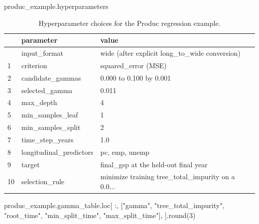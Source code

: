 \documentclass[
  letterpaper,
  DIV=11,
  numbers=noendperiod]{scrartcl}
\newenvironment{Shaded}{\begin{snugshade}}{\end{snugshade}}
\newcommand{\BuiltInTok}[1]{\textcolor[rgb]{0.00,0.23,0.31}{#1}}
\newcommand{\DecValTok}[1]{\textcolor[rgb]{0.68,0.00,0.00}{#1}}
\newcommand{\NormalTok}[1]{\textcolor[rgb]{0.00,0.23,0.31}{#1}}
\newcommand{\StringTok}[1]{\textcolor[rgb]{0.13,0.47,0.30}{#1}}
\begin{document}
\begin{Shaded}
\begin{Highlighting}[]
\NormalTok{produc\_example.hyperparameters}
\end{Highlighting}
\end{Shaded}

\begin{longtable}[]{@{}lll@{}}

\caption{\label{tbl-produc-hyperparameters}Hyperparameter choices for
the Produc regression example.}

\tabularnewline

\toprule\noalign{}
& parameter & value \\
\midrule\noalign{}
\endhead
\bottomrule\noalign{}
\endlastfoot
0 & input\_format & wide (after explicit long\_to\_wide conversion) \\
1 & criterion & squared\_error (MSE) \\
2 & candidate\_gammas & 0.000 to 0.100 by 0.001 \\
3 & selected\_gamma & 0.011 \\
4 & max\_depth & 4 \\
5 & min\_samples\_leaf & 1 \\
6 & min\_samples\_split & 2 \\
7 & time\_step\_years & 1.0 \\
8 & longitudinal\_predictors & pc, emp, unemp \\
9 & target & final\_gsp at the held-out final year \\
10 & selection\_rule & minimize training tree\_total\_impurity on a
0.0... \\

\end{longtable}

\begin{Shaded}
\begin{Highlighting}[]
\NormalTok{produc\_example.gamma\_table.loc[}
\NormalTok{    :,}
\NormalTok{    [}\StringTok{"gamma"}\NormalTok{, }\StringTok{"tree\_total\_impurity"}\NormalTok{, }\StringTok{"root\_time"}\NormalTok{, }\StringTok{"min\_split\_time"}\NormalTok{, }\StringTok{"max\_split\_time"}\NormalTok{],}
\NormalTok{].}\BuiltInTok{round}\NormalTok{(}\DecValTok{3}\NormalTok{)}
\end{Highlighting}
\end{Shaded}
\end{document}
